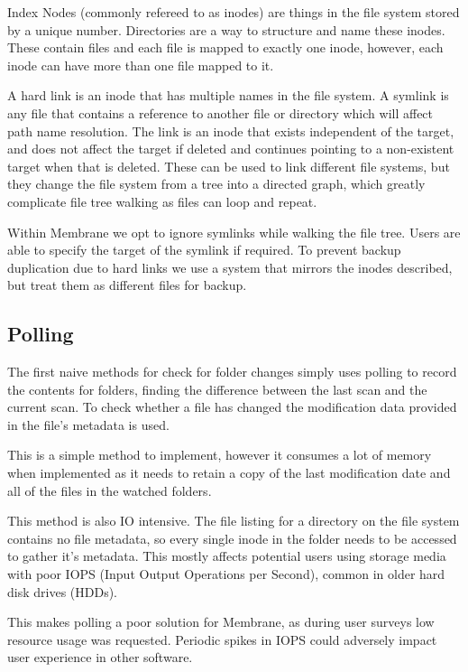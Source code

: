\documentclass[11pt, a4paper, twocolumn, twoside]{report}
\begin{document}
Index Nodes (commonly refereed to as inodes) are things in the file system stored by a unique number. Directories are a way to structure and name these inodes. These contain files and each file is mapped to exactly one inode, however, each inode can have more than one file mapped to it. \citep{bar2001linux}

A hard link is an inode that has multiple names in the file system. A symlink is any file that contains a reference to another file or directory which will affect path name resolution. The link is an inode that exists independent of the target, and does not affect the target if deleted and continues pointing to a non-existent target when that is deleted. \citep{yue2011unix} These can be used to link different file systems, but they change the file system from a tree into a directed graph, which greatly complicate file tree walking as files can loop and repeat.

Within Membrane we opt to ignore symlinks while walking the file tree. Users are able to specify the target of the symlink if required. To prevent backup duplication due to hard links we use a system that mirrors the inodes described, but treat them as different files for backup.

\subsection{Polling}

The first naive methods for check for folder changes simply uses polling to record the contents for folders, finding the difference between the last scan and the current scan. To check whether a file has changed the modification data provided in the file's metadata is used.

This is a simple method to implement, however it consumes a lot of memory when implemented as it needs to retain a copy of the last modification date and all of the files in the watched folders.

This method is also IO intensive. The file listing for a directory on the file system contains no file metadata, so every single inode in the folder needs to be accessed to gather it's metadata. This mostly affects potential users using storage media with poor IOPS (Input Output Operations per Second), common in older hard disk drives (HDDs). \citep{mansurov2017storage}

This makes polling a poor solution for Membrane, as during user surveys low resource usage was requested. Periodic spikes in IOPS could adversely impact user experience in other software.
\end{document}
